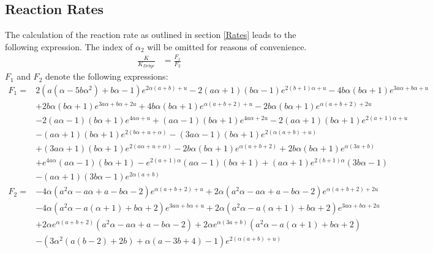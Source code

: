 \subsection{Reaction Rates}
The calculation of the reaction rate as outlined in section \ref{Rates} leads to the following expression. The index of $\alpha_2$ will be omitted for reasons of convenience.
\begin{align}
    \frac{K}{K_{Debye}} &= \frac{F_1}{F_2}
    \label{two_state_rate}
\end{align}
$F_1$ and $F_2$ denote the following expressions:
\begin{align*}
    F_1 =& 2 \left(a \left(\alpha-5 b \alpha^2\right)+b \alpha-1\right) e^{2 \alpha (a+b)+u}-2 (a \alpha+1) (b \alpha-1) e^{2 (b+1) \alpha+u}-4 b \alpha (b \alpha+1) e^{3 a \alpha+b \alpha+u} \\
    &+2 b \alpha (b \alpha+1) e^{3 a \alpha+b \alpha+2 u}+4 b \alpha (b \alpha+1) e^{\alpha (a+b+2)+u}-2 b \alpha (b \alpha+1) e^{\alpha (a+b+2)+2 u} \\
    &-2 (a \alpha-1) (b \alpha+1) e^{4 a \alpha+u}+(a \alpha-1) (b \alpha+1) e^{4 a \alpha+2 u}-2 (a \alpha+1) (b \alpha+1) e^{2 (a+1) \alpha+u} \\
    &-(a \alpha+1) (b \alpha+1) e^{2 (b \alpha+u+\alpha)}-(3 a \alpha-1) (b \alpha+1) e^{2 (\alpha (a+b)+u)} \\
    &+(3 a \alpha+1) (b \alpha+1) e^{2 (a \alpha+u+\alpha)}-2 b \alpha (b \alpha+1) e^{\alpha (a+b+2)}+2 b \alpha (b \alpha+1) e^{\alpha (3 a+b)} \\
    &+e^{4 a \alpha} (a \alpha-1) (b \alpha+1)-e^{2 (a+1) \alpha} (a \alpha-1) (b \alpha+1)+(a \alpha+1) e^{2 (b+1) \alpha} (3 b \alpha-1) \\
    &-(a \alpha+1) (3 b \alpha-1) e^{2 \alpha (a+b)} \\
    F_2 =& -4 \alpha \left(a^2 \alpha-a \alpha+a-b \alpha-2\right) e^{\alpha (a+b+2)+u}+2 \alpha \left(a^2 \alpha-a \alpha+a-b \alpha-2\right) e^{\alpha (a+b+2)+2 u} \\
    &-4 \alpha \left(a^2 \alpha-a (\alpha+1)+b \alpha+2\right) e^{3 a \alpha+b \alpha+u}+2 \alpha \left(a^2 \alpha-a (\alpha+1)+b \alpha+2\right) e^{3 a \alpha+b \alpha+2 u} \\
    &+2 \alpha e^{\alpha (a+b+2)} \left(a^2 \alpha-a \alpha+a-b \alpha-2\right)+2 \alpha e^{\alpha (3 a+b)} \left(a^2 \alpha-a (\alpha+1)+b \alpha+2\right) \\
    &-\left(3 \alpha^2 (a (b-2)+2 b)+\alpha (a-3 b+4)-1\right) e^{2 (\alpha (a+b)+u)} \\

\end{align*}
